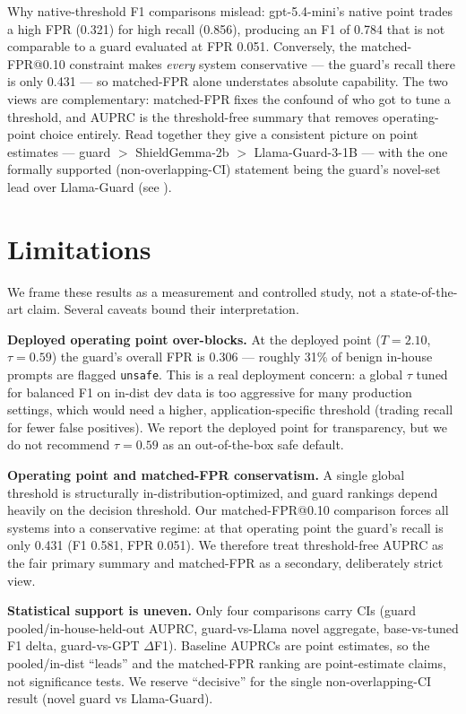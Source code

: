\documentclass[sigconf,nonacm]{acmart}
\begin{document}
Why native-threshold F1 comparisons mislead: gpt-5.4-mini's native point trades a high FPR (0.321) for high recall (0.856), producing an F1 of 0.784 that is not comparable to a guard evaluated at FPR 0.051. Conversely, the matched-FPR@0.10 constraint makes \emph{every} system conservative --- the guard's recall there is only 0.431 --- so matched-FPR alone understates absolute capability. The two views are complementary: matched-FPR fixes the confound of who got to tune a threshold, and AUPRC is the threshold-free summary that removes operating-point choice entirely. Read together they give a consistent picture on point estimates --- guard $>$ ShieldGemma-2b $>$ Llama-Guard-3-1B --- with the one formally supported (non-overlapping-CI) statement being the guard's novel-set lead over Llama-Guard (see ).

\section{Limitations}
\label{sec:limitations}

We frame these results as a measurement and controlled study, not a state-of-the-art claim. Several caveats bound their interpretation.

\textbf{Deployed operating point over-blocks.} At the deployed point ($T=2.10$, $\tau=0.59$) the guard's overall FPR is 0.306 --- roughly 31\% of benign in-house prompts are flagged \texttt{unsafe}. This is a real deployment concern: a global $\tau$ tuned for balanced F1 on in-dist dev data is too aggressive for many production settings, which would need a higher, application-specific threshold (trading recall for fewer false positives). We report the deployed point for transparency, but we do not recommend $\tau=0.59$ as an out-of-the-box safe default.

\textbf{Operating point and matched-FPR conservatism.} A single global threshold is structurally in-distribution-optimized, and guard rankings depend heavily on the decision threshold. Our matched-FPR@0.10 comparison forces all systems into a conservative regime: at that operating point the guard's recall is only 0.431 (F1 0.581, FPR 0.051). We therefore treat threshold-free AUPRC as the fair primary summary and matched-FPR as a secondary, deliberately strict view.

\textbf{Statistical support is uneven.} Only four comparisons carry CIs (guard pooled/in-house-held-out AUPRC, guard-vs-Llama novel aggregate, base-vs-tuned F1 delta, guard-vs-GPT $\Delta$F1). Baseline AUPRCs are point estimates, so the pooled/in-dist ``leads'' and the matched-FPR ranking are point-estimate claims, not significance tests. We reserve ``decisive'' for the single non-overlapping-CI result (novel guard vs Llama-Guard).
\end{document}

